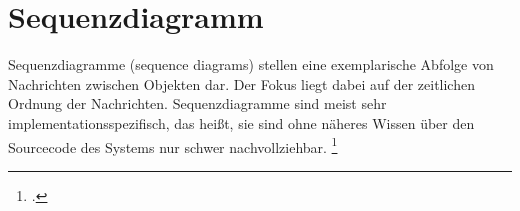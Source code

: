 \documentclass{lehramt-informatik}
\begin{document}

\chapter{Sequenzdiagramm}

\begin{quellen}
\cite[Seite 401-471]{rupp}
\cite[Zusammengefügtes PDF Seite 115-117 / Kapitel „Assoziationen“ 33-35]{brinda}
\end{quellen}

Sequenzdiagramme (sequence diagrams) stellen eine exemplarische Abfolge
von Nachrichten zwischen Objekten dar. Der Fokus liegt dabei auf der
zeitlichen Ordnung der Nachrichten. Sequenzdiagramme sind meist sehr
implementationsspezifisch, das heißt, sie sind ohne näheres Wissen
über den Sourcecode des Systems nur schwer nachvollziehbar.
\footcite[Seite 167]{schatten}
\end{document}
